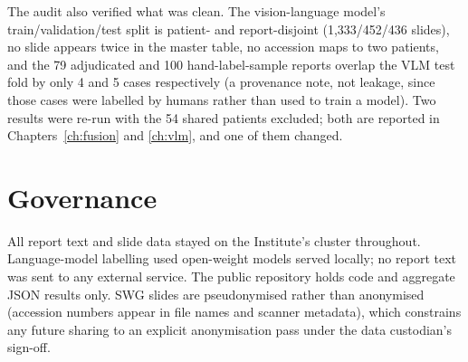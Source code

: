 The audit also verified what was clean. The vision-language model's train/validation/test split is patient- and report-disjoint (1,333/452/436 slides), no slide appears twice in the master table, no accession maps to two patients, and the 79 adjudicated and 100 hand-label-sample reports overlap the VLM test fold by only 4 and 5 cases respectively (a provenance note, not leakage, since those cases were labelled by humans rather than used to train a model). Two results were re-run with the 54 shared patients excluded; both are reported in Chapters~\ref{ch:fusion} and \ref{ch:vlm}, and one of them changed.

\section{Governance}

All report text and slide data stayed on the Institute's cluster throughout. Language-model labelling used open-weight models served locally; no report text was sent to any external service. The public repository holds code and aggregate JSON results only. SWG slides are pseudonymised rather than anonymised (accession numbers appear in file names and scanner metadata), which constrains any future sharing to an explicit anonymisation pass under the data custodian's sign-off.

